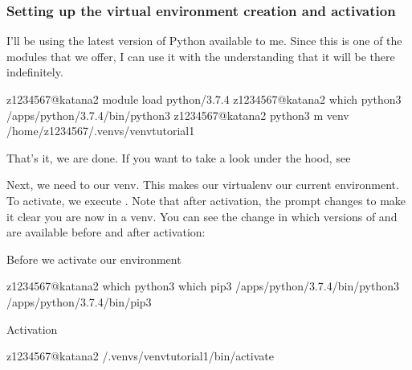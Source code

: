 \documentclass[letterpaper,10pt,english]{sphinxmanual}
\begin{document}
\subsubsection{Setting up the virtual environment \sphinxhyphen{} creation and activation}
\label{\detokenize{software/python-virtualenvs:setting-up-the-virtual-environment-creation-and-activation}}
I’ll be using the latest version of Python available to me. Since this is one of the modules that we offer, I can use it with the understanding that it will be there indefinitely.

\begin{sphinxVerbatim}[commandchars=\\\{\}]
\PYG{o}{[}z1234567@katana2 \PYGZti{}\PYG{o}{]}\PYGZdl{} module load python/3.7.4
\PYG{o}{[}z1234567@katana2 \PYGZti{}\PYG{o}{]}\PYGZdl{} which python3
/apps/python/3.7.4/bin/python3
z1234567@katana2 \PYGZti{}\PYG{o}{]}\PYGZdl{} python3 \PYGZhy{}m venv /home/z1234567/.venvs/venv\PYGZhy{}tutorial\PYGZhy{}1
\end{sphinxVerbatim}

That’s it, we are done. If you want to take a look under the hood, see 

Next, we need to  our venv. This makes our virtualenv our current environment. To activate, we execute . Note that after activation, the prompt changes to make it clear you are now in a venv. You can see the change in which versions of  and  are available before and after activation:

Before we activate our environment

\begin{sphinxVerbatim}[commandchars=\\\{\}]
\PYG{o}{[}z1234567@katana2 \PYGZti{}\PYG{o}{]}\PYGZdl{} which python3 which pip3
/apps/python/3.7.4/bin/python3
/apps/python/3.7.4/bin/pip3
\end{sphinxVerbatim}

Activation

\begin{sphinxVerbatim}[commandchars=\\\{\}]
\PYG{o}{[}z1234567@katana2 \PYGZti{}\PYG{o}{]}\PYGZdl{}  \PYGZti{}/.venvs/venv\PYGZhy{}tutorial\PYGZhy{}1/bin/activate
\end{sphinxVerbatim}
\end{document}
